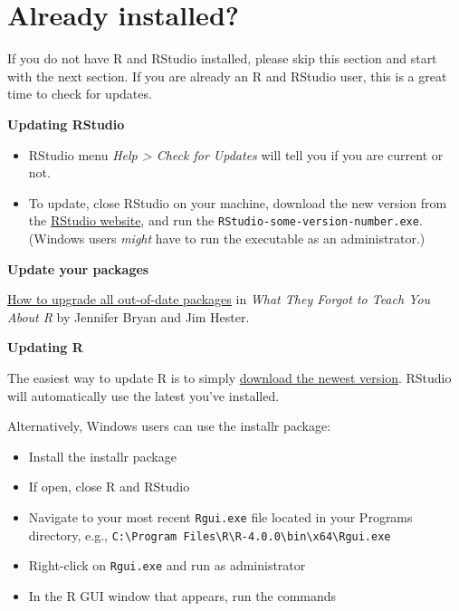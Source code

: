 \documentclass[
]{book}
\providecommand{\tightlist}{%
  \setlength{\itemsep}{0pt}\setlength{\parskip}{0pt}}
\begin{document}
\hypertarget{already-installed}{%
\section{Already installed?}\label{already-installed}}

If you do not have R and RStudio installed, please skip this section and start with the next section. If you are already an R and RStudio user, this is a great time to check for updates.

\textbf{Updating RStudio}

\begin{itemize}
\tightlist
\item
  RStudio menu \emph{Help \textgreater{} Check for Updates} will tell you if you are current or not.
\item
  To update, close RStudio on your machine, download the new version from the \href{https://www.rstudio.com/products/rstudio/\#Desktop}{RStudio website}, and run the \texttt{RStudio-some-version-number.exe}. (Windows users \emph{might} have to run the executable as an administrator.)
\end{itemize}

\textbf{Update your packages}

\href{https://rstats.wtf/maintaining-r.html\#how-to-upgrade-all-out-of-date-packages}{How to upgrade all out-of-date packages} in \emph{What They Forgot to Teach You About R} by Jennifer Bryan and Jim Hester.

\textbf{Updating R}

The easiest way to update R is to simply \href{https://cloud.r-project.org/}{download the newest version}. RStudio will automatically use the latest you've installed.

Alternatively, Windows users can use the installr package:

\begin{itemize}
\tightlist
\item
  Install the installr package
\item
  If open, close R and RStudio
\item
  Navigate to your most recent \texttt{Rgui.exe} file located in your Programs directory, e.g., \texttt{C:\textbackslash{}Program\ Files\textbackslash{}R\textbackslash{}R-4.0.0\textbackslash{}bin\textbackslash{}x64\textbackslash{}Rgui.exe}\\
\item
  Right-click on \texttt{Rgui.exe} and run as administrator
\item
  In the R GUI window that appears, run the commands
\end{itemize}
\end{document}

